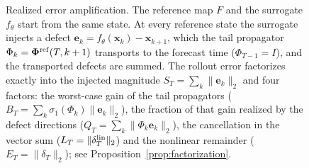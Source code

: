 \begin{figure}[t]
{%
}
\caption{Realized error amplification. The reference map $F$ and the surrogate $f_\theta$ start from the same state. At every reference state the surrogate injects a defect $\mathbf e_k=f_\theta(\mathbf x_k)-\mathbf x_{k+1}$, which the tail propagator $\Phi_k=\boldsymbol{\Phi}^{\rm ref}(T,k+1)$ transports to the forecast time ($\Phi_{T-1}=I$), and the transported defects are summed. The rollout error factorizes exactly into the injected magnitude $S_T=\sum_k\|\mathbf e_k\|_2$ and four factors: the worst-case gain of the tail propagators ($B_T=\sum_k\sigma_1(\Phi_k)\|\mathbf e_k\|_2$), the fraction of that gain realized by the defect directions ($Q_T=\sum_k\|\Phi_k\mathbf e_k\|_2$), the cancellation in the vector sum ($L_T=\|\delta^{\rm lin}_T\|_2$) and the nonlinear remainder ($E_T=\|\delta_T\|_2$); see Proposition~\ref{prop:factorization}.}
\label{fig:concept}
\end{figure}
